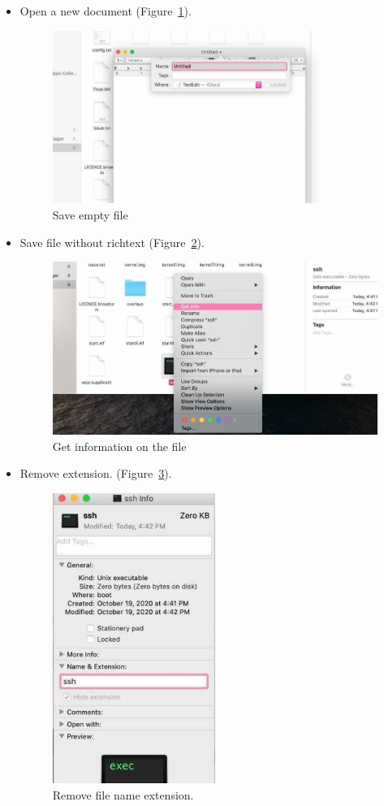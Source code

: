 \documentclass{article}
\begin{document}
\begin{enumerate}
\begin{itemize}
\begin{itemize}
  \item Open a new document (Figure~\ref{fig:Mac3}).

\begin{figure}
\includegraphics[width=1.00\textwidth]{1_MACtext_3}
\caption{Save empty file}
\label{fig:Mac3}
\end{figure}
  \item Save file without richtext (Figure~\ref{fig:Mac4}).

\begin{figure}
\includegraphics[width=.500\textwidth]{1_MACtext_4}
\caption{Get information on the file}
\label{fig:Mac4}
\end{figure}

  \item Remove extension. (Figure~\ref{fig:Mac5}).

\begin{figure}
\includegraphics[width=0.50\textwidth]{1_MACtext_5}
\caption{Remove file name extension.}
\label{fig:Mac5}
\end{figure}


\end{itemize}
\end{itemize}
\end{enumerate}
\end{document}
